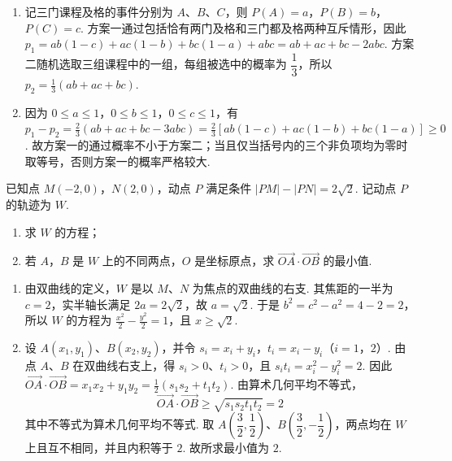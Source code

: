 \begin{solution}
\begin{enumerate}
\item 记三门课程及格的事件分别为 \(A\)、\(B\)、\(C\)，则
\(P(A)=a\)，\(P(B)=b\)，\(P(C)=c\).
方案一通过包括恰有两门及格和三门都及格两种互斥情形，因此
\(p_1=ab(1-c)+ac(1-b)+bc(1-a)+abc=ab+ac+bc-2abc\). 方案二随机选取三组课程中的一组，每组被选中的概率为 \(\dfrac13\)，所以 \(p_2=\frac13\left(ab+ac+bc\right)\).
\item 因为 \(0\leqslant a\leqslant1\)，\(0\leqslant b\leqslant1\)，\(0\leqslant c\leqslant1\)，有
\(p_1-p_2=\frac23\left(ab+ac+bc-3abc\right)=\frac23\left[ab(1-c)+ac(1-b)+bc(1-a)\right]\geqslant0\).
故方案一的通过概率不小于方案二；当且仅当括号内的三个非负项均为零时取等号，否则方案一的概率严格较大.
\end{enumerate}
\end{solution}

\begin{problem}
已知点 \(M(-2,0)\)，\(N(2,0)\)，动点 \(P\) 满足条件 \(\left|PM\right|-\left|PN\right|=2\sqrt{2}\). 记动点 \(P\) 的轨迹为 \(W\).

\begin{enumerate}
\item 求 \(W\) 的方程；
\item 若 \(A\)，\(B\) 是 \(W\) 上的不同两点，\(O\) 是坐标原点，求 \(\overrightarrow{OA}\cdot\overrightarrow{OB}\) 的最小值.
\end{enumerate}
\end{problem}

\begin{solution}
\begin{enumerate}
\item 由双曲线的定义，\(W\) 是以 \(M\)、\(N\) 为焦点的双曲线的右支. 其焦距的一半为 \(c=2\)，实半轴长满足 \(2a=2\sqrt2\)，故 \(a=\sqrt2\). 于是 \(b^2=c^2-a^2=4-2=2\)，所以 \(W\) 的方程为 \(\frac{x^2}{2}-\frac{y^2}{2}=1\)，且 \(x\geqslant\sqrt2\).
\item 设 \(A(x_1,y_1)\)、\(B(x_2,y_2)\)，并令 \(s_i=x_i+y_i\)，\(t_i=x_i-y_i\)（\(i=1\)，\(2\)）.
由点 \(A\)、\(B\) 在双曲线右支上，得 \(s_i>0\)、\(t_i>0\)，且
\(s_it_i=x_i^2-y_i^2=2\).
因此
\(\overrightarrow{OA}\cdot\overrightarrow{OB}=x_1x_2+y_1y_2=\frac12\left(s_1s_2+t_1t_2\right)\).
由算术几何平均不等式，
\[
\overrightarrow{OA}\cdot\overrightarrow{OB}
\geqslant\sqrt{s_1s_2t_1t_2}=2
\]
其中不等式为算术几何平均不等式. 取 \(A\left(\dfrac32,\dfrac12\right)\)、\(B\left(\dfrac32,-\dfrac12\right)\)，两点均在 \(W\) 上且互不相同，并且内积等于 \(2\). 故所求最小值为 \(2\).
\end{enumerate}
\end{solution}

